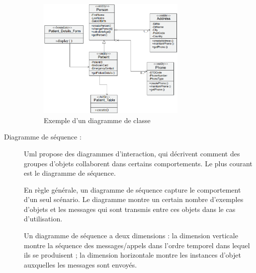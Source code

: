 \documentclass[french]{report}
\begin{document}
\begin{description}
                \begin{figure}[H] 
                    \center 
                    \includegraphics[width=0.7\textwidth,keepaspectratio]{images/diag classe example.png} 
                    \caption{Exemple d'un diagramme de classe}
                    \label{UML logo}
                \end{figure}
                
                \item[Diagramme de séquence :]
                Uml propose des diagrammes d'interaction, qui décrivent comment des groupes d'objets 
		collaborent dans certains comportements. Le plus courant est le diagramme de séquence.\cite{fowler2004uml}
                
                En règle générale, un diagramme de séquence capture le comportement d'un seul scénario. 
		Le diagramme montre un certain nombre d'exemples d'objets et les messages qui sont transmis 
		entre ces objets dans le cas d'utilisation.\cite{fowler2004uml}
                
                Un diagramme de séquence a deux dimensions : la dimension verticale montre la séquence des
		messages/appels dans l'ordre temporel dans lequel ils se produisent ; 
		la dimension horizontale montre les instances d'objet auxquelles les messages sont envoyés.\cite{IBM}
                

\end{description}
\end{document}
